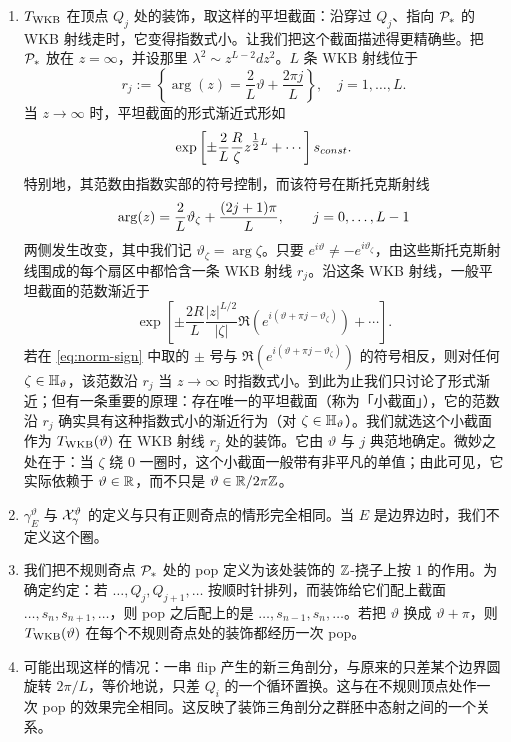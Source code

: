 \begin{enumerate}
\item $T_{\rm WKB}$ 在顶点 $Q_j$ 处的装饰，取这样的平坦截面：沿穿过 $Q_j$、指向 $\mathcal{P}_*$ 的 WKB 射线走时，它变得指数式小。让我们把这个截面描述得更精确些。把 $\mathcal{P}_*$ 放在 $z = \infty$，并设那里 $\lambda^2 \sim z^{L-2} dz^2$。$L$ 条 WKB 射线位于
\begin{equation}\label{eq:PolyRays}
r_j := \left\{ \arg(z) = \frac{2}{L} \vartheta + \frac{2\pi j}{L} \right\}, \quad j=1, \dots, L.
\end{equation}
当 $z \to \infty$ 时，平坦截面的形式渐近式形如
\begin{equation}\label{eq:ch11-formal-asymp}
\exp \left[ \pm \frac{2}{L}\frac{R}{\zeta} z^{\tfrac{1}{2} L} + \cdots \right] s_{const}.
\end{equation}
特别地，其范数由指数实部的符号控制，而该符号在斯托克斯射线
\begin{equation}\label{eq:ch11-stokes-rays}
{\rm arg}(z) = \frac{2}{L}\vartheta_\zeta + \frac{(2j+1)\pi}{L}, \qquad j = 0, \dots, L-1
\end{equation}
两侧发生改变，其中我们记 $\vartheta_\zeta = \arg \zeta$。只要 $e^{i\vartheta} \not= - e^{i\vartheta_\zeta}$，由这些斯托克斯射线围成的每个扇区中都恰含一条 WKB 射线 $r_j$。沿这条 WKB 射线，一般平坦截面的范数渐近于
\begin{equation} \label{eq:norm-sign}
\exp\left[ \pm \frac{ 2 R}{L} \frac{\vert z\vert^{L/2}}{\vert \zeta\vert} \Re \left(e^{i (\vartheta + \pi j - \vartheta_\zeta)} \right) + \cdots \right].
\end{equation}
若在 \eqref{eq:norm-sign} 中取的 $\pm$ 号与 $\Re\left(e^{i (\vartheta + \pi j - \vartheta_\zeta)} \right)$ 的符号相反，则对任何 $\zeta \in {\mathbb{H}}_\vartheta$，该范数沿 $r_j$ 当 $z \to \infty$ 时指数式小。到此为止我们只讨论了形式渐近；但有一条重要的原理：存在唯一的平坦截面（称为「小截面」），它的范数沿 $r_j$ 确实具有这种指数式小的渐近行为（对 $\zeta \in {\mathbb{H}}_\vartheta$）。我们就选这个小截面作为 $T_{\rm WKB}(\vartheta)$ 在 WKB 射线 $r_j$ 处的装饰。它由 $\vartheta$ 与 $j$ 典范地确定。微妙之处在于：当 $\zeta$ 绕 $0$ 一圈时，这个小截面一般带有非平凡的单值；由此可见，它实际依赖于 $\vartheta \in \mathbb{R}$，而不只是 $\vartheta \in \mathbb{R} / 2 \pi \mathbb{Z}$。

\item $\gamma^\vartheta_E$ 与 $\mathcal{X}^\vartheta_{\gamma}$ 的定义与只有正则奇点的情形完全相同。当 $E$ 是边界边时，我们不定义这个圈。

\item 我们把不规则奇点 $\mathcal{P}_*$ 处的 pop 定义为该处装饰的 $\mathbb{Z}$-挠子上按 $1$ 的作用。为确定约定：若 $\dots, Q_j, Q_{j+1}, \dots$ 按顺时针排列，而装饰给它们配上截面 $\dots, s_n, s_{n+1}, \dots$，则 pop 之后配上的是 $\dots, s_{n-1}, s_{n}, \dots$。若把 $\vartheta$ 换成 $\vartheta + \pi$，则 $T_{\rm WKB}(\vartheta)$ 在每个不规则奇点处的装饰都经历一次 pop。

\item 可能出现这样的情况：一串 flip 产生的新三角剖分，与原来的只差某个边界圆旋转 $2\pi/L$，等价地说，只差 $Q_i$ 的一个循环置换。这与在不规则顶点处作一次 pop 的效果完全相同。这反映了装饰三角剖分之群胚中态射之间的一个关系。

\end{enumerate}

